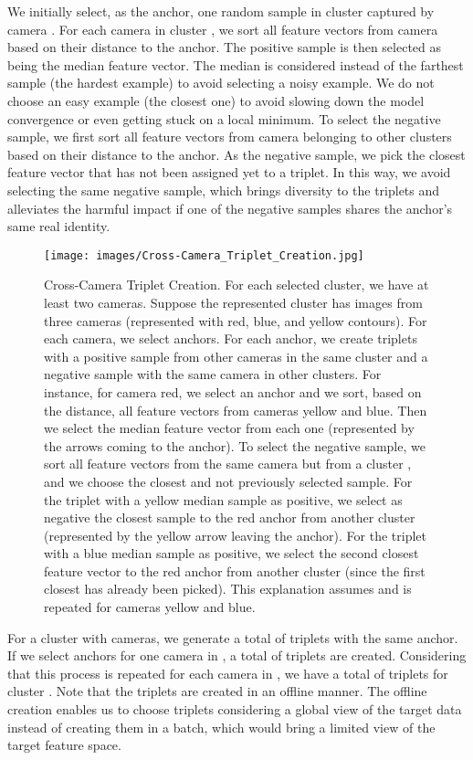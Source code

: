 \documentclass[journal]{IEEEtran}
\begin{document}
We initially select, as the anchor, one random sample in cluster  captured by camera . For each camera  in cluster , we sort all feature vectors from camera  based on their distance to the anchor. The positive sample is then selected as being the median feature vector. The median is considered instead of the farthest sample (the hardest example) to avoid selecting a noisy example. We do not choose an easy example (the closest one) to avoid slowing down the model convergence or even getting stuck on a local minimum.
To select the negative sample, we first sort all feature vectors from camera  belonging to other clusters  based on their distance to the anchor. As the negative sample, we pick the closest feature vector that has not been assigned yet to a triplet. In this way, we avoid selecting the same negative sample, which brings diversity to the triplets and alleviates the harmful impact if one of the negative samples shares the anchor's same real identity.




\begin{figure}[ht]
\centering
\texttt{[image: images/Cross-Camera\_Triplet\_Creation.jpg]}
\caption{Cross-Camera Triplet Creation. For each selected cluster, we have at least two cameras. Suppose the represented cluster  has images from three cameras (represented with red, blue, and yellow contours). For each camera, we select  anchors. For each anchor, we create triplets with a positive sample from other cameras in the same cluster and a negative sample with the same camera in other clusters. For instance, for camera red, we select an anchor and we sort, based on the distance, all feature vectors from cameras yellow and blue. Then we select the median feature vector from each one (represented by the arrows coming to the anchor). To select the negative sample, we sort all feature vectors from the same camera but from a cluster , and we choose the closest and not previously selected sample. For the triplet with a yellow median sample as positive, we select as negative the closest sample to the red anchor from another cluster (represented by the yellow arrow leaving the anchor). For the triplet with a blue median sample as positive, we select the second closest feature vector to the red anchor from another cluster (since the first closest has already been picked). This explanation assumes  and is repeated for cameras yellow and blue.}
\label{fig:cross_camera_triplet_creation}
\end{figure}

For a cluster  with  cameras, we generate a total of  triplets with the same anchor. If we select  anchors for one camera in , a total of  triplets are created. 
Considering that this process is repeated for each camera in , we have a total of  triplets for cluster .
Note that the triplets are created in an offline manner. The offline creation enables us to choose triplets considering a global view of the target data instead of creating them in a batch, which would bring a limited view of the target feature space. 
\end{document}
